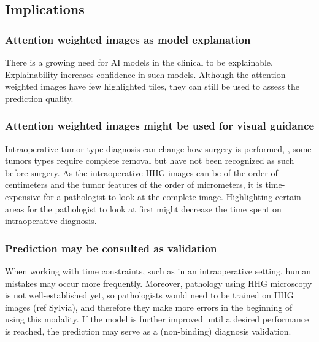 \subsection{Implications}

\subsubsection{Attention weighted images as model explanation}
There is a growing need for AI models in the clinical to be explainable.
Explainability increases confidence in such models.
Although the attention weighted images have few highlighted tiles, they can still be used to assess the prediction quality.

\subsubsection{Attention weighted images might be used for visual guidance}
Intraoperative tumor type diagnosis can change how surgery is performed, \eg, some tumors types require complete removal but have not been recognized as such before surgery.
As the intraoperative HHG images can be of the order of centimeters and the tumor features of the order of micrometers, it is time-expensive for a pathologist to look at the complete image.
Highlighting certain areas for the pathologist to look at first might decrease the time spent on intraoperative diagnosis.

\subsubsection{Prediction may be consulted as validation}
When working with time constraints, such as in an intraoperative setting, human mistakes may occur more frequently.
Moreover, pathology using HHG microscopy is not well-established yet, so pathologists would need to be trained on HHG images (ref Sylvia), and therefore they make more errors in the beginning of using this modality.
If the model is further improved until a desired performance is reached, the prediction may serve as a (non-binding) diagnosis validation.
